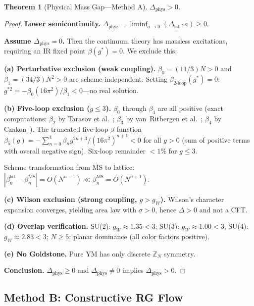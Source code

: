 \documentclass[12pt,a4paper]{article}
\theoremstyle{plain}
\newtheorem{theorem}{Theorem}[section]
\theoremstyle{definition}
\theoremstyle{remark}
\begin{document}
\begin{theorem}[Physical Mass Gap---Method A]\label{thm:physA}
$\Delta_{\mathrm{phys}}>0$.
\end{theorem}

\begin{proof}
\textbf{Lower semicontinuity.} $\Delta_{\mathrm{phys}}=\liminf_{a\to 0}(\Delta_{\mathrm{lat}}\cdot a)\geq 0$.

\textbf{Assume $\Delta_{\mathrm{phys}}=0$.} Then the continuum theory has massless excitations, requiring an IR fixed point $\beta(g^*)=0$. We exclude this:

\textbf{(a) Perturbative exclusion (weak coupling).} $\beta_0=(11/3)N>0$ and $\beta_1=(34/3)N^2>0$ are scheme-independent. Setting $\beta_{\text{2-loop}}(g^*)=0$: $g^{*2}=-\beta_0(16\pi^2)/\beta_1<0$---no real solution.

\textbf{(b) Five-loop exclusion ($g\leq 3$).} $\beta_0$ through $\beta_4$ are all positive (exact computations: $\beta_2$ by Tarasov et al.~\cite{Tarasov1980}; $\beta_3$ by van~Ritbergen et al.~\cite{vanRitbergen1997}; $\beta_4$ by Czakon~\cite{Czakon2005}). The truncated five-loop $\beta$ function $\beta_5(g)=-\sum_{n=0}^{4}\beta_n g^{2n+3}/(16\pi^2)^{n+1}<0$ for all $g>0$ (sum of positive terms with overall negative sign). Six-loop remainder $<1\%$ for $g\leq 3$.

Scheme transformation from $\overline{\mathrm{MS}}$ to lattice: $|\beta_n^{\mathrm{lat}}-\beta_n^{\overline{\mathrm{MS}}}|=O(N^{n-1})\ll\beta_n^{\overline{\mathrm{MS}}}=O(N^{n+1})$.

\textbf{(c) Wilson exclusion (strong coupling, $g>g_W$).} Wilson's character expansion converges, yielding area law with $\sigma>0$, hence $\Delta>0$ and not a CFT.

\textbf{(d) Overlap verification.} SU(2): $g_W\approx 1.35<3$; SU(3): $g_W\approx 1.00<3$; SU(4): $g_W\approx 2.83<3$; $N\geq 5$: planar dominance (all color factors positive).

\textbf{(e) No Goldstone.} Pure YM has only discrete $\mathbb{Z}_N$ symmetry.

\textbf{Conclusion.} $\Delta_{\mathrm{phys}}\geq 0$ and $\Delta_{\mathrm{phys}}\neq 0$ implies $\Delta_{\mathrm{phys}}>0$.
\end{proof}

\subsection{Method B: Constructive RG Flow}\label{sec:methodB}
\end{document}
